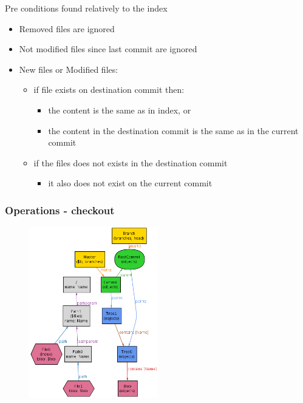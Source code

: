 \documentclass{beamer}
\begin{document}
\begin{frame}
   \begin{block}{Pre conditions found relatively to the index}
      \begin{itemize}
         \item Removed files are ignored
         \item Not modified files since last commit are ignored
         \item New files or Modified files:
            \begin{itemize}
               \item if file exists on destination commit then:
                  \begin{itemize}
                     \item the content is the same as in index, or
                     \item the content in the destination commit is the same as in the current commit
                  \end{itemize}
               \item if the files does not exists in the destination commit
                  \begin{itemize}
                     \item it also does not exist on the current commit
                  \end{itemize}
            \end{itemize}
      \end{itemize}
   \end{block}
\end{frame}

\begin{frame}[fragile]
   \frametitle{Operations - checkout}
      \begin{figure}
         \centering
         \includegraphics[width=0.50\textwidth]{images/checkout1.png}
      \end{figure}
\end{frame}
\end{document}
